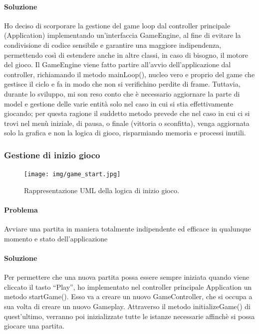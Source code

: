 \paragraph{Soluzione} Ho deciso di scorporare la gestione del game loop dal controller principale (Application) implementando un’interfaccia GameEngine, al fine di evitare la condivisione di codice sensibile e garantire una maggiore indipendenza, permettendo così di estendere anche in altre classi, in caso di bisogno, il motore del gioco. Il GameEngine viene fatto partire all’avvio dell’applicazione dal controller, richiamando il metodo mainLoop(), nucleo vero e proprio del game che gestisce il ciclo e fa in modo che non si verifichino perdite di frame. Tuttavia, durante lo sviluppo, mi son reso conto che è necessario aggiornare la parte di model e gestione delle varie entità solo nel caso in cui si stia effettivamente giocando; per questa ragione il suddetto metodo prevede che nel caso in cui ci si trovi nel menù iniziale, di pausa, o finale (vittoria o sconfitta), venga aggiornata solo la grafica e non la logica di gioco, risparmiando memoria e processi inutili.

\subsubsection{Gestione di inizio gioco}

\begin{figure}[H]
\centering{}
\texttt{[image: img/game\_start.jpg]}
\caption{Rappresentazione UML della logica di inizio gioco.}
\end{figure}

\paragraph{Problema} Avviare una partita in maniera totalmente indipendente ed efficace in qualunque momento e stato dell’applicazione

\paragraph{Soluzione} Per permettere che una nuova partita possa essere sempre iniziata quando viene cliccato il tasto “Play”, ho implementato nel controller principale Application un metodo startGame(). Esso va a creare un nuovo GameController, che si occupa a sua volta di creare un nuovo Gameplay. Attraverso il metodo initializeGame() di quest’ultimo, verranno poi inizializzate tutte le istanze necessarie affinchè si possa giocare una partita.

